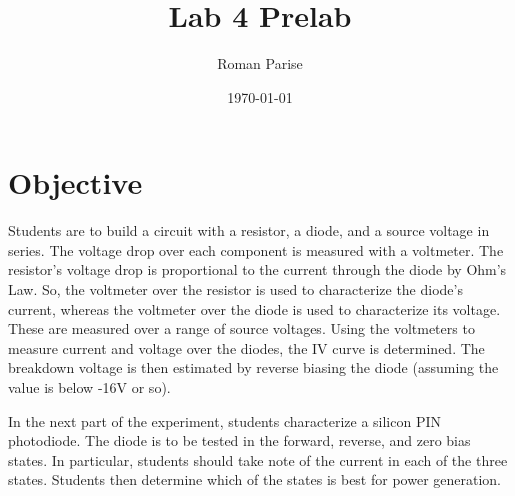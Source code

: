 \documentclass{article}
\title{Lab 4 Prelab}
\author{Roman Parise}
\date{\today}
\begin{document}
\maketitle
\section{Objective}
\scriptsize{
Students are to build a circuit with a resistor, a diode, and a source voltage in series. The voltage drop over each component is measured with a voltmeter. The resistor's voltage drop is proportional to the current through the diode by Ohm's Law. So, the voltmeter over the resistor is used to characterize the diode's current, whereas the voltmeter over the diode is used to characterize its voltage. These are measured over a range of source voltages. Using the voltmeters to measure current and voltage over the diodes, the IV curve is determined. The breakdown voltage is then estimated by reverse biasing the diode (assuming the value is below -16V or so).

In the next part of the experiment, students characterize a silicon PIN photodiode. The diode is to be tested in the forward, reverse, and zero bias states. In particular, students should take note of the current in each of the three states. Students then determine which of the states is best for power generation.
}
\end{document}
